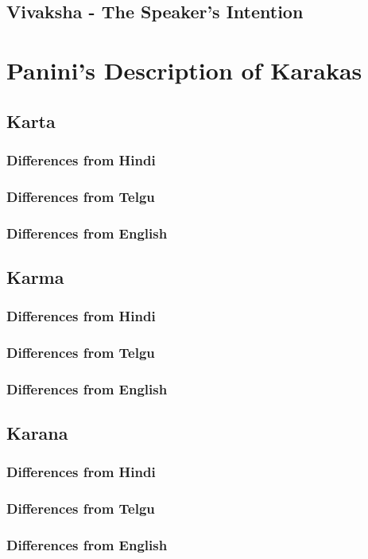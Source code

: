 \documentclass[a4paper,10pt]{article}
\begin{document}
\subsection{Vivaksha - The Speaker's Intention}
\section{Panini's Description of Karakas}
\subsection{Karta}
\subsubsection{Differences from Hindi}
\subsubsection{Differences from Telgu}
\subsubsection{Differences from English}
\subsection{Karma}
\subsubsection{Differences from Hindi}
\subsubsection{Differences from Telgu}
\subsubsection{Differences from English}
\subsection{Karana}
\subsubsection{Differences from Hindi}
\subsubsection{Differences from Telgu}
\subsubsection{Differences from English}
\end{document}
